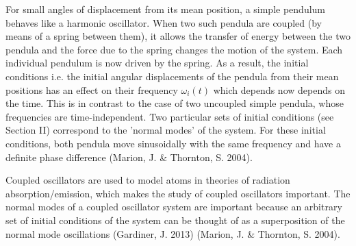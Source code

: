 \documentclass[main.tex]{subfiles}
\begin{document}
For small angles of displacement from its mean position, a simple pendulum behaves like a harmonic oscillator. When two such pendula are coupled (by means of a spring between them), it allows the transfer of energy between the two pendula and the force due to the spring changes the motion of the system. Each individual pendulum is now driven by the spring. As a result, the initial conditions i.e. the initial angular displacements of the pendula from their mean positions has an effect on their frequency $\omega_i (t)$ which depends now depends on the time. This is in contrast to the case of two uncoupled simple pendula, whose frequencies are time-independent. Two particular sets of initial conditions (see Section II) correspond to the 'normal modes' of the system. For these initial conditions, both pendula move sinusoidally with the same frequency and have a definite phase difference (Marion, J. \& Thornton, S. 2004).


Coupled oscillators are used to model atoms in theories of radiation absorption/emission, which makes the study of coupled oscillators important. The normal modes of a coupled oscillator system are important because an arbitrary set of initial conditions of the system can be thought of as a superposition of the normal mode oscillations (Gardiner, J. 2013) (Marion, J. \& Thornton, S. 2004).
\end{document}
